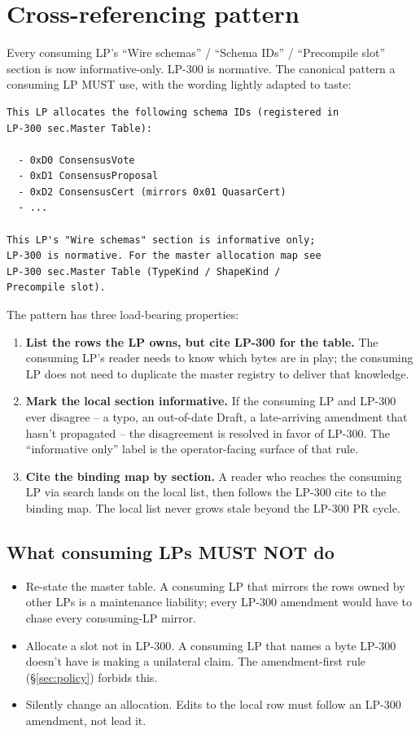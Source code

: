 \section{Cross-referencing pattern}
\label{sec:xref}

Every consuming LP's ``Wire schemas'' / ``Schema IDs'' / ``Precompile
slot'' section is now informative-only. LP-300 is normative. The
canonical pattern a consuming LP MUST use, with the wording lightly
adapted to taste:

\begin{lstlisting}
This LP allocates the following schema IDs (registered in
LP-300 sec.Master Table):

  - 0xD0 ConsensusVote
  - 0xD1 ConsensusProposal
  - 0xD2 ConsensusCert (mirrors 0x01 QuasarCert)
  - ...

This LP's "Wire schemas" section is informative only;
LP-300 is normative. For the master allocation map see
LP-300 sec.Master Table (TypeKind / ShapeKind /
Precompile slot).
\end{lstlisting}

The pattern has three load-bearing properties:

\begin{enumerate}[leftmargin=2em,nosep]
\item \textbf{List the rows the LP owns, but cite LP-300 for the
  table.} The consuming LP's reader needs to know which bytes are in
  play; the consuming LP does not need to duplicate the master
  registry to deliver that knowledge.
\item \textbf{Mark the local section informative.} If the consuming
  LP and LP-300 ever disagree -- a typo, an out-of-date Draft, a
  late-arriving amendment that hasn't propagated -- the disagreement
  is resolved in favor of LP-300. The ``informative only'' label is
  the operator-facing surface of that rule.
\item \textbf{Cite the binding map by section.} A reader who reaches
  the consuming LP via search lands on the local list, then follows
  the LP-300 cite to the binding map. The local list never grows
  stale beyond the LP-300 PR cycle.
\end{enumerate}

\subsection{What consuming LPs MUST NOT do}

\begin{itemize}[leftmargin=2em,nosep]
\item Re-state the master table. A consuming LP that mirrors the
  rows owned by other LPs is a maintenance liability; every LP-300
  amendment would have to chase every consuming-LP mirror.
\item Allocate a slot not in LP-300. A consuming LP that names a
  byte LP-300 doesn't have is making a unilateral claim. The
  amendment-first rule (\S\ref{sec:policy}) forbids this.
\item Silently change an allocation. Edits to the local row must
  follow an LP-300 amendment, not lead it.
\end{itemize}

